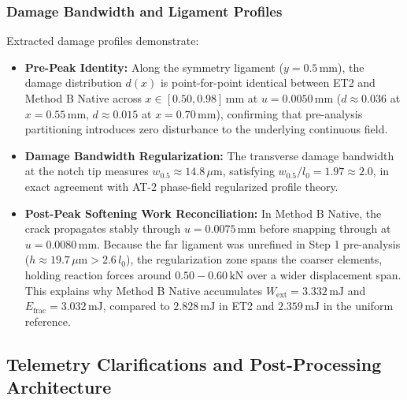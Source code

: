 \subsubsection{Damage Bandwidth and Ligament Profiles}
Extracted damage profiles demonstrate:
\begin{itemize}
  \item \textbf{Pre-Peak Identity:} Along the symmetry ligament ($y = 0.5\,\mathrm{mm}$), the damage distribution $d(x)$ is point-for-point identical between ET2 and Method B Native across $x \in [0.50, 0.98]\,\mathrm{mm}$ at $u = 0.0050\,\mathrm{mm}$ ($d \approx 0.036$ at $x = 0.55\,\mathrm{mm}$, $d \approx 0.015$ at $x = 0.70\,\mathrm{mm}$), confirming that pre-analysis partitioning introduces zero disturbance to the underlying continuous field.
  \item \textbf{Damage Bandwidth Regularization:} The transverse damage bandwidth at the notch tip measures $w_{0.5} \approx 14.8\,\mu\mathrm{m}$, satisfying $w_{0.5} / l_0 = 1.97 \approx 2.0$, in exact agreement with AT-2 phase-field regularized profile theory.
  \item \textbf{Post-Peak Softening Work Reconciliation:} In Method B Native, the crack propagates stably through $u = 0.0075\,\mathrm{mm}$ before snapping through at $u = 0.0080\,\mathrm{mm}$. Because the far ligament was unrefined in Step 1 pre-analysis ($h \approx 19.7\,\mu\mathrm{m} > 2.6\,l_0$), the regularization zone spans the coarser elements, holding reaction forces around $0.50 - 0.60\,\mathrm{kN}$ over a wider displacement span. This explains why Method B Native accumulates $W_{\mathrm{ext}} = 3.332\,\mathrm{mJ}$ and $E_{\mathrm{frac}} = 3.032\,\mathrm{mJ}$, compared to $2.828\,\mathrm{mJ}$ in ET2 and $2.359\,\mathrm{mJ}$ in the uniform reference.
\end{itemize}

\subsection{Telemetry Clarifications and Post-Processing Architecture}
\label{subsec:gate6b_telemetry_clarifications}

